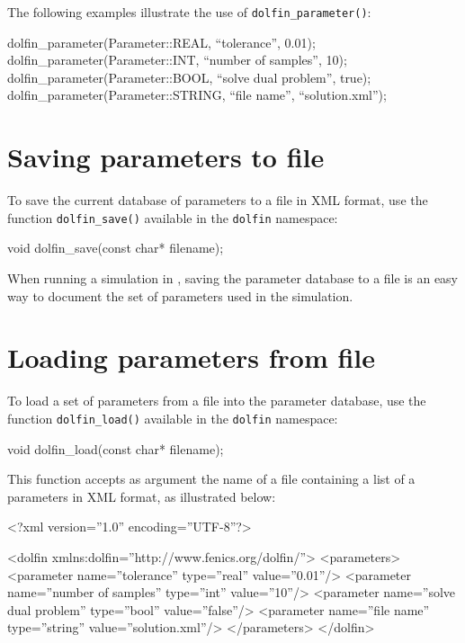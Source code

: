 The following examples illustrate the use of
\texttt{dolfin\_parameter()}:
\footnotesize
\begin{code}
  dolfin_parameter(Parameter::REAL, ``tolerance'', 0.01);
  dolfin_parameter(Parameter::INT, ``number of samples'', 10);
  dolfin_parameter(Parameter::BOOL, ``solve dual problem'', true);
  dolfin_parameter(Parameter::STRING, ``file name'', ``solution.xml'');
\end{code}
\normalsize

\section{Saving parameters to file}

To save the current database of parameters to a file in \dolfin{} XML
format, use the function \texttt{dolfin\_save()} available in the
\texttt{dolfin} namespace:
\begin{code}
  void dolfin_save(const char* filename);
\end{code}
When running a simulation in \dolfin{}, saving the parameter database
to a file is an easy way to document the set of parameters used in the
simulation.

\section{Loading parameters from file}

To load a set of parameters from a file into the parameter database,
use the function \texttt{dolfin\_load()} available in the
\texttt{dolfin} namespace:
\begin{code}
  void dolfin_load(const char* filename);
\end{code}
This function accepts as argument the name of a file containing a list
of a parameters in \dolfin{} XML format, as illustrated below:
\footnotesize
\begin{code}
<?xml version=''1.0'' encoding=''UTF-8''?> 

<dolfin xmlns:dolfin=''http://www.fenics.org/dolfin/''> 
  <parameters>
    <parameter name=''tolerance'' type=''real'' value=''0.01''/>
    <parameter name=''number of samples'' type=''int'' value=''10''/>
    <parameter name=''solve dual problem'' type=''bool'' value=''false''/>
    <parameter name=''file name'' type=''string'' value=''solution.xml''/>
  </parameters>
</dolfin>
\end{code}
\normalsize
